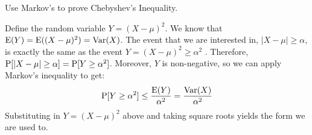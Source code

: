 \question Use Markov's to prove Chebyshev's Inequality.
\begin{solution}[3cm]
Define the random variable $Y = (X - \mu)^2$. We know that $\E(Y) =\E((X - \mu)^2) = \var(X)$. 
The event that we are interested in, $|X - \mu| \geq \alpha$, is exactly the same as the event $Y = (X - \mu)^2 \geq \alpha ^2$ .
Therefore, $\P[|X -\mu| \geq \alpha] = \P[Y \geq \alpha^2 ]$. \newline 
Moreover, $Y$ is non-negative, so we can apply Markov's inequality to get: 
\[\P[Y \geq \alpha^2] \leq \frac{\E(Y)}{\alpha^2} = \frac{\var(X)}{\alpha^2}\]
Substituting in $Y = (X-\mu)^2$ above and taking square roots yields the form we are used to.
\end{solution}